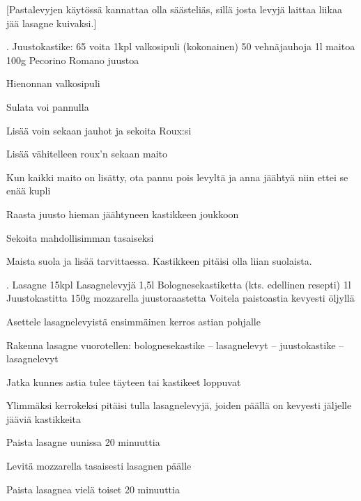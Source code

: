 [Pastalevyjen käytössä kannattaa olla säästeliäs, sillä josta levyjä laittaa liikaa jää lasagne kuivaksi.]

\begin{step}
. Juustokastike:
  65 voita
  1kpl valkosipuli (kokonainen)
  50 vehnäjauhoja
  1l maitoa
  100g Pecorino Romano juustoa

\method
Hienonnan valkosipuli

Sulata voi pannulla

Lisää voin sekaan jauhot ja sekoita Roux:si

Lisää vähitelleen roux'n sekaan maito

Kun kaikki maito on lisätty, ota pannu pois levyltä ja anna jäähtyä niin ettei se enää kupli

Raasta juusto hieman jäähtyneen kastikkeen joukkoon

Sekoita mahdollisimman tasaiseksi

Maista suola ja lisää tarvittaessa. Kastikkeen pitäisi olla liian suolaista.
\end{step}

\begin{step}
. Lasagne
  15kpl Lasagnelevyjä
  1,5l Bolognesekastiketta (kts. edellinen resepti)
  1l Juustokastitta
  150g mozzarella juustoraastetta
\method
Voitela paistoastia kevyesti öljyllä

Asettele lasagnelevyistä ensimmäinen kerros astian pohjalle

Rakenna lasagne vuorotellen: bolognesekastike – lasagnelevyt – juustokastike – lasagnelevyt

Jatka kunnes astia tulee täyteen tai kastikeet loppuvat

Ylimmäksi kerrokeksi pitäisi tulla lasagnelevyjä, joiden päällä on kevyesti jäljelle jääviä kastikkeita

Paista lasagne  uunissa 20 minuuttia

Levitä mozzarella tasaisesti lasagnen päälle

Paista lasagnea vielä toiset 20 minuuttia 

\end{step}
